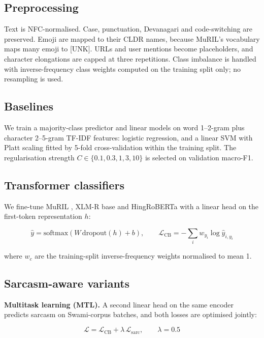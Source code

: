 \documentclass[10pt,twocolumn]{article}
\begin{document}
\subsection{Preprocessing}

Text is NFC-normalised. Case, punctuation, Devanagari and code-switching are preserved. Emoji are mapped to their CLDR
names, because MuRIL's vocabulary maps many emoji to [UNK]. URLs and user mentions become placeholders, and character
elongations are capped at three repetitions. Class imbalance is handled with inverse-frequency class weights computed on
the training split only; no resampling is used.

\subsection{Baselines}

We train a majority-class predictor and linear models on word 1--2-gram plus character 2--5-gram TF-IDF features: logistic
regression, and a linear SVM with Platt scaling fitted by 5-fold cross-validation within the training split. The
regularisation strength $C\in\{0.1,0.3,1,3,10\}$ is selected on validation macro-F1.

\subsection{Transformer classifiers}

We fine-tune MuRIL \cite{khanuja2021muril}, XLM-R base \cite{conneau2020xlmr} and HingRoBERTa \cite{nayak2022hingbert}
with a linear head on the first-token representation $h$:

\begin{equation}\hat{y}=\mathrm{softmax}(W\,\mathrm{dropout}(h)+b),\qquad \mathcal{L}_{\mathrm{CB}}=-\sum_i w_{y_i}\log \hat{y}_{i,y_i}\end{equation}

where $w_c$ are the training-split inverse-frequency weights normalised to mean 1.

\subsection{Sarcasm-aware variants}

\textbf{Multitask learning (MTL).} A second linear head on the same encoder predicts sarcasm on Swami-corpus batches,
and both losses are optimised jointly:

\begin{equation}\mathcal{L}=\mathcal{L}_{\mathrm{CB}}+\lambda\,\mathcal{L}_{\mathrm{sarc}},\qquad \lambda=0.5\end{equation}
\end{document}
